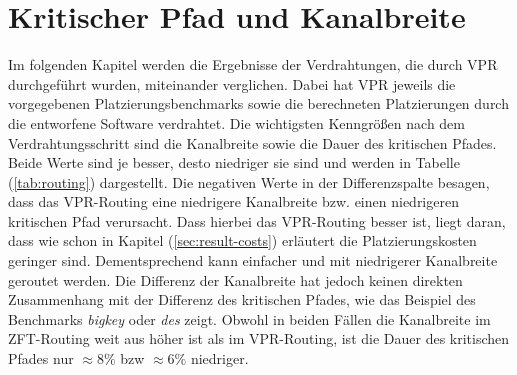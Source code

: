     \section{Kritischer Pfad und Kanalbreite}\label{sec:result-routing}

        Im folgenden Kapitel werden die Ergebnisse der Verdrahtungen, die durch VPR durchgeführt wurden,
        miteinander verglichen. Dabei hat VPR jeweils die vorgegebenen Platzierungsbenchmarks sowie die
        berechneten Platzierungen durch die entworfene Software verdrahtet.
        Die wichtigsten Kenngrößen nach dem Verdrahtungsschritt sind die Kanalbreite
        sowie die Dauer des kritischen Pfades. Beide Werte sind je besser,
        desto niedriger sie sind und werden in Tabelle (\ref{tab:routing}) dargestellt.
        Die negativen Werte in der Differenzspalte besagen, dass das VPR-Routing eine
        niedrigere Kanalbreite bzw. einen niedrigeren kritischen Pfad verursacht.
        Dass hierbei das VPR-Routing besser ist, liegt daran, dass wie schon in Kapitel (\ref{sec:result-costs})
        erläutert die Platzierungskosten geringer sind. 
        Dementsprechend kann einfacher und mit niedrigerer Kanalbreite
        geroutet werden. Die Differenz der Kanalbreite hat jedoch keinen direkten Zusammenhang mit der
        Differenz des kritischen Pfades, wie das Beispiel des Benchmarks \textit{bigkey} oder \textit{des} zeigt.
        Obwohl in beiden Fällen die Kanalbreite im ZFT-Routing weit aus höher ist als im VPR-Routing, ist
        die Dauer des kritischen Pfades nur $\approx 8\%$ bzw $\approx 6\%$ niedriger.


